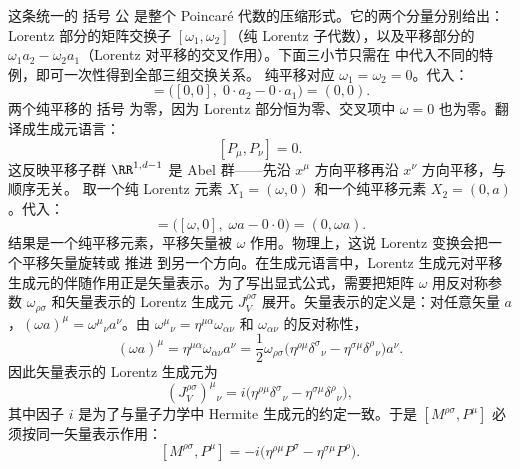 这条统一的 括号 公 是整个 Poincaré 代数的压缩形式。它的两个分量分别给出：Lorentz 部分的矩阵交换子 $[\omega_1,\omega_2]$（纯 Lorentz 子代数），以及平移部分的 $\omega_1 a_2-\omega_2 a_1$（Lorentz 对平移的交叉作用）。下面三小节只需在 中代入不同的特例，即可一次性得到全部三组交换关系。
纯平移对应 $\omega_1=\omega_2=0$。代入：
\begin{equation*}
[(0,a_1),(0,a_2)]=\big([0,0],\;0\cdot a_2-0\cdot a_1\big)=(0,0).
\end{equation*}
两个纯平移的 括号 为零，因为 Lorentz 部分恒为零、交叉项中 $\omega=0$ 也为零。翻译成生成元语言：
\begin{equation}\label{eq:ms-poincare-PP}
{[P_\mu,P_\nu]=0.}
\end{equation}
这反映平移子群 $\RR^{1,d-1}$ 是 Abel 群——先沿 $x^\mu$ 方向平移再沿 $x^\nu$ 方向平移，与顺序无关。
取一个纯 Lorentz 元素 $X_1=(\omega,0)$ 和一个纯平移元素 $X_2=(0,a)$。代入：
\begin{equation*}
[(\omega,0),(0,a)]=\big([\omega,0],\;\omega a-0\cdot 0\big)=(0,\omega a).
\end{equation*}
结果是一个纯平移元素，平移矢量被 $\omega$ 作用。物理上，这说 Lorentz 变换会把一个平移矢量旋转或 推进 到另一个方向。在生成元语言中，Lorentz 生成元对平移生成元的伴随作用正是矢量表示。为了写出显式公式，需要把矩阵 $\omega$ 用反对称参数 $\omega_{\rho\sigma}$ 和矢量表示的 Lorentz 生成元 $J_V^{\rho\sigma}$ 展开。矢量表示的定义是：对任意矢量 $a$，$(\omega a)^\mu=\omega^\mu{}_\nu a^\nu$。由 $\omega^\mu{}_\nu=\eta^{\mu\alpha}\omega_{\alpha\nu}$ 和 $\omega_{\alpha\nu}$ 的反对称性，
\begin{equation*}
(\omega a)^\mu=\eta^{\mu\alpha}\omega_{\alpha\nu}a^\nu=\frac{1}{2}\omega_{\rho\sigma}\big(\eta^{\rho\mu}\delta^\sigma{}_\nu-\eta^{\sigma\mu}\delta^\rho{}_\nu\big)a^\nu.
\end{equation*}
因此矢量表示的 Lorentz 生成元为
\begin{equation}\label{eq:ms-poincare-JV}
{
(J_V^{\rho\sigma})^\mu{}_\nu=i\big(\eta^{\rho\mu}\delta^\sigma{}_\nu-\eta^{\sigma\mu}\delta^\rho{}_\nu\big),
}
\end{equation}
其中因子 $i$ 是为了与量子力学中 Hermite 生成元的约定一致。于是 $[M^{\rho\sigma},P^\mu]$ 必须按同一矢量表示作用：
\begin{equation}\label{eq:ms-poincare-MP}
{
[M^{\rho\sigma},P^\mu]=-i\big(\eta^{\rho\mu}P^\sigma-\eta^{\sigma\mu}P^\rho\big).
}
\end{equation}
